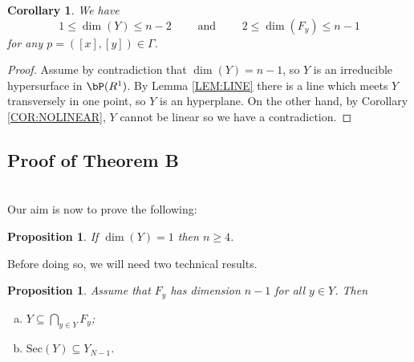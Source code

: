 \documentclass[a4paper,11pt]{amsart}
\newtheorem{corollary}[theorem]{Corollary}
\newtheorem{proposition}[theorem]{Proposition}
\begin{document}
\begin{corollary} 
\label{COR:DIMY2}
We have $$1\leq \dim(Y)\leq n-2\qquad \mbox{ and }\qquad 2\leq \dim(F_y)\leq n-1$$ for any $p=([x],[y])\in \Gamma$.
\end{corollary}

\begin{proof}
Assume by contradiction that $\dim(Y)=n-1$, so $Y$ is an irreducible hypersurface in $\bP(R^1)$. By Lemma \ref{LEM:LINE} there is a line which meets $Y$ transversely in one point, so $Y$ is an hyperplane. On the other hand, by Corollary \ref{COR:NOLINEAR}, $Y$ cannot be linear so we have a contradiction.
\end{proof}


\subsection{Proof of Theorem B}
$\,$\\

Our aim is now to prove the following:

\begin{proposition}
\label{PROP:MAININEQ}
If $\dim(Y)= 1$ then $n\geq 4$. 
\end{proposition}

Before doing so, we will need two technical results.

\begin{proposition}
\label{PROP:ALTERNATIVA}
Assume that $F_y$ has dimension $n-1$ for all $y\in Y$. Then
\begin{enumerate}[(a)]
\item $Y\subseteq \bigcap_{y\in Y}F_y$;
\item $\mathrm{Sec}(Y)\subseteq Y_{N-1}$.
\end{enumerate}
\end{proposition}
\end{document}
